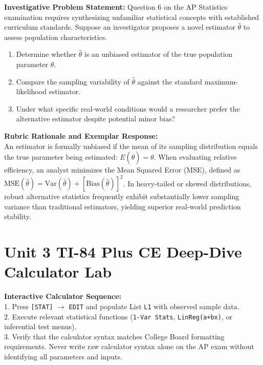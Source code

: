 \begin{frqrubricbox}
\textbf{Investigative Problem Statement:} Question 6 on the AP Statistics examination requires synthesizing unfamiliar statistical concepts with established curriculum standards. Suppose an investigator proposes a novel estimator $\hat{\theta}$ to assess population characteristics.
\begin{enumerate}[label=(\alph*)]
  \item Determine whether $\hat{\theta}$ is an unbiased estimator of the true population parameter $\theta$.
  \item Compare the sampling variability of $\hat{\theta}$ against the standard maximum-likelihood estimator.
  \item Under what specific real-world conditions would a researcher prefer the alternative estimator despite potential minor bias?
\end{enumerate}
\textbf{Rubric Rationale and Exemplar Response:}\\
An estimator is formally unbiased if the mean of its sampling distribution equals the true parameter being estimated: $E(\hat{\theta}) = \theta$. When evaluating relative efficiency, an analyst minimizes the Mean Squared Error (MSE), defined as $\text{MSE}(\hat{\theta}) = \text{Var}(\hat{\theta}) + [\text{Bias}(\hat{\theta})]^2$. In heavy-tailed or skewed distributions, robust alternative statistics frequently exhibit substantially lower sampling variance than traditional estimators, yielding superior real-world prediction stability.
\end{frqrubricbox}\vspace{6pt}
\section{Unit 3 TI-84 Plus CE Deep-Dive Calculator Lab}
\begin{calculatorbox}
\textbf{Interactive Calculator Sequence:}\\
1. Press \texttt{[STAT]} $\rightarrow$ \texttt{EDIT} and populate List \texttt{L1} with observed sample data.\\
2. Execute relevant statistical functions (\texttt{1-Var Stats}, \texttt{LinReg(a+bx)}, or inferential test menus).\\
3. Verify that the calculator syntax matches College Board formatting requirements. Never write raw calculator syntax alone on the AP exam without identifying all parameters and inputs.
\end{calculatorbox}\vspace{10pt}
